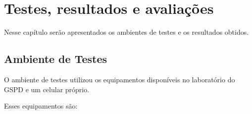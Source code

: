
\chapter{Testes, resultados e avaliações}
\label{cap4}

Nesse capítulo serão apresentados os ambientes de testes e os resultados obtidos.

\section{Ambiente de Testes}

    O ambiente de testes utilizou os equipamentos disponíveis no laboratório do GSPD e um celular próprio.
    
    Esses equipamentos são:
    
